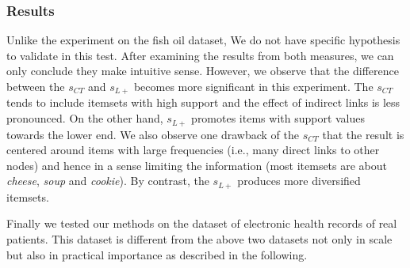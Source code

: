 


\subsubsection{Results}
Unlike the experiment on the fish oil dataset, We do not have specific hypothesis to validate in this test. After examining the results from both measures, we can only conclude they make intuitive sense. However, we observe that the difference between the $s_{CT}$ and $s_{L+}$ becomes more significant in this experiment. The $s_{CT}$ tends to include itemsets with high support and the effect of indirect links is less pronounced. On the other hand, $s_{L+}$ promotes items with support values towards the lower end. We also observe one drawback of the $s_{CT}$ that the result is centered around items with large frequencies (i.e., many direct links to other nodes) and hence in a sense limiting the information (most itemsets are about \emph{cheese}, \emph{soup} and \emph{cookie}). By contrast, the $s_{L+}$ produces more diversified itemsets.

Finally we tested our methods on the dataset of electronic health records of real patients. This dataset is different from the above two datasets not only in scale but also in practical importance as described in the following.



